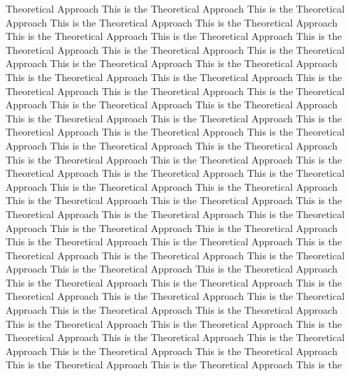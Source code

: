 \documentclass[twocolumn,a4paper,10pt,twoside]{article}
\begin{document}
Theoretical Approach This is the Theoretical Approach This is the Theoretical Approach This is the Theoretical Approach This is the Theoretical Approach This is the Theoretical Approach This is the Theoretical Approach This is the Theoretical Approach This is the Theoretical Approach This is the Theoretical Approach This is the Theoretical Approach This is the Theoretical Approach This is the Theoretical Approach This is the Theoretical Approach This is the Theoretical Approach This is the Theoretical Approach This is the Theoretical Approach This is the Theoretical Approach This is the Theoretical Approach This is the Theoretical Approach This is the Theoretical Approach This is the Theoretical Approach This is the Theoretical Approach This is the Theoretical Approach This is the Theoretical Approach This is the Theoretical Approach This is the Theoretical Approach This is the Theoretical Approach This is the Theoretical Approach This is the Theoretical Approach This is the Theoretical Approach This is the Theoretical Approach This is the Theoretical Approach This is the Theoretical Approach This is the Theoretical Approach This is the Theoretical Approach This is the Theoretical Approach This is the Theoretical Approach This is the Theoretical Approach This is the Theoretical Approach This is the Theoretical Approach This is the Theoretical Approach This is the Theoretical Approach This is the Theoretical Approach This is the Theoretical Approach This is the Theoretical Approach This is the Theoretical Approach This is the Theoretical Approach This is the Theoretical Approach This is the Theoretical Approach This is the Theoretical Approach This is the Theoretical Approach This is the Theoretical Approach This is the Theoretical Approach This is the Theoretical Approach This is the Theoretical Approach This is the Theoretical Approach This is the Theoretical Approach This is the Theoretical Approach This is the Theoretical Approach This is the Theoretical Approach This is the Theoretical Approach This is the Theoretical Approach This is the 
\end{document}
